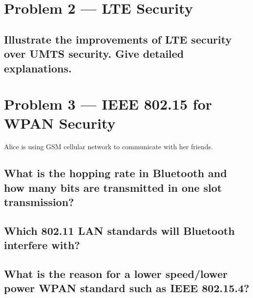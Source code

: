 \documentclass[a4paper]{report}
\begin{document}
\section{Problem 2 --- LTE Security}

\subsection{Illustrate the improvements of LTE security over UMTS security.
            Give detailed explanations.}

\section{Problem 3 --- IEEE 802.15 for WPAN Security}

Alice is using GSM cellular network to communicate with her friends.

\subsection{What is the hopping rate in Bluetooth and how many bits are
            transmitted in one slot transmission?}


\subsection{Which 802.11 LAN standards will Bluetooth interfere with?}


\subsection{What is the reason for a lower speed/lower power WPAN standard
            such as IEEE 802.15.4?}
\end{document}
